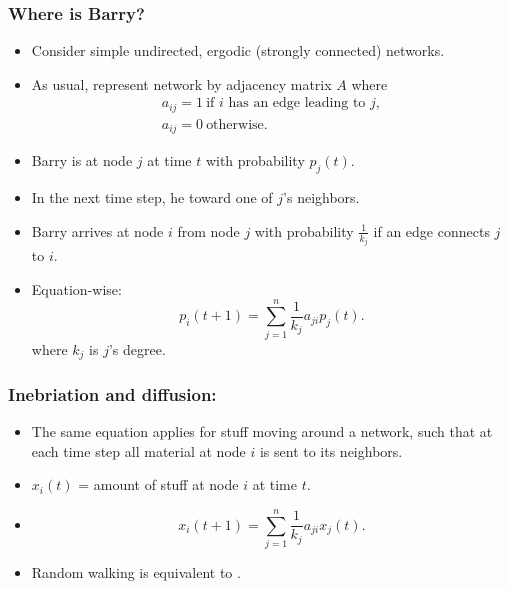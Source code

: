 \begin{frame}
  \frametitle{Where is Barry?}

  \begin{itemize}
  \item<1->
    Consider simple undirected, ergodic (strongly connected) networks.
  \item<2->
    As usual, represent network by \alert{adjacency matrix $A$}
    where
    $$
    \begin{array}{l}
      a_{ij}=1 \ \mbox{if $i$ has an edge leading to $j$}, \\
      a_{ij}=0 \ \mbox{otherwise.}
    \end{array}
    $$
  \item<3->
    Barry is at node $j$ at time $t$ with probability $p_j(t)$.
  \item<4->
    In the next time step, 
    he 
     toward one of $j$'s neighbors.
  \item<5->
    Barry arrives at node $i$ from node $j$ with probability
    $\frac{1}{k_j}$ if an edge connects $j$ to $i$.
  \item<6->
    Equation-wise:
    $$
      p_i(t+1) = \sum_{j=1}^{n} \frac{1}{k_j}  a_{ji} p_j(t).
    $$
    where $k_j$ is $j$'s degree.
  \end{itemize}

\end{frame}

\begin{frame}
  \frametitle{Inebriation and diffusion:}
  
  \begin{itemize}
  \item<1->
     The same equation
    applies for stuff moving around a network, such that
    at each time step all material at node $i$ is sent
    to its neighbors.  
  \item<2->
    $x_i(t)$ = amount of stuff at node $i$ at time $t$.
  \item<3->
    $$
      x_i(t+1) = \sum_{j=1}^{n} \frac{1}{k_j}  a_{ji} x_j(t).
    $$
  \item<4->
    Random walking is equivalent to
    .
  \end{itemize}
\end{frame}

